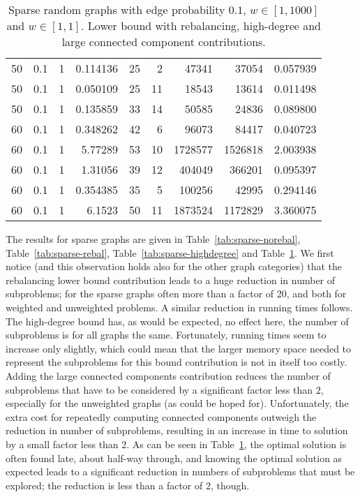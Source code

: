 \documentclass[a4paper,11pt]{article}
\begin{document}
\begin{table}
\begin{center}
\begin{tabular}{|rrr|r|r|rrr|r|}
50 & 0.1 & 1 & 0.114136 & 25 & 2 & 47341 & 37054 & 0.057939 \\
50 & 0.1 & 1 & 0.050109 & 25 & 11 & 18543 & 13614 & 0.011498 \\
50 & 0.1 & 1 & 0.135859 & 33 & 14 & 50585 & 24836 & 0.089800 \\
60 & 0.1 & 1 & 0.348262 & 42 & 6 & 96073 & 84417 & 0.040723 \\
60 & 0.1 & 1 & 5.77289 & 53 & 10 & 1728577 & 1526818 & 2.003938 \\
60 & 0.1 & 1 & 1.31056 & 39 & 12 & 404049 & 366201 & 0.095397 \\
60 & 0.1 & 1 & 0.354385 & 35 & 5 & 100256 & 42995 & 0.294146 \\
60 & 0.1 & 1 & 6.1523 & 50 & 11 & 1873524 & 1172829 & 3.360075 \\
\hline
\end{tabular}
\end{center}
\caption{Sparse random graphs with edge probability $0.1$,
  $w\in[1,1000]$ and $w\in[1,1]$. Lower bound with rebalancing, 
  high-degree and large connected component contributions.}
\label{tab:sparse-all}
\end{table}

The results for sparse graphs are given in
Table~\ref{tab:sparse-norebal}, Table~\ref{tab:sparse-rebal},
Table~\ref{tab:sparse-highdegree} and Table~\ref{tab:sparse-all}.  We
first notice (and this observation holds also for the other graph
categories) that the rebalancing lower bound contribution leads to a
huge reduction in number of subproblems; for the sparse graphs often
more than a factor of 20, and both for weighted and unweighted
problems. A similar reduction in running times follows. The
high-degree bound has, as would be expected, no effect here, the
number of subproblems is for all graphs the same. Fortunately, running
times seem to increase only slightly, which could mean that the
larger memory space needed to represent the subproblems for this bound
contribution is not in itself too costly. Adding the large connected
components contribution reduces the number of subproblems that have to
be considered by a significant factor less than 2, especially for the
unweighted graphs (as could be hoped for). Unfortunately, the extra
cost for repeatedly computing connected components outweigh the
reduction in number of subproblems, resulting in an increase in time
to solution by a small factor less than 2. As can be seen in
Table~\ref{tab:sparse-all}, the optimal solution is often found late,
about half-way through, and knowing the optimal solution as expected
leads to a significant reduction in numbers of subproblems that must
be explored; the reduction is less than a factor of 2, though.
\end{document}

